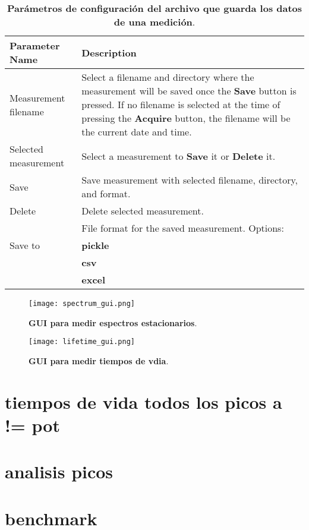 \begin{table}[htbp]
    \centering
    \begin{tabularx}{\textwidth}{|l|X|}
        \hline
        \textbf{Parameter Name} & \textbf{Description} \\
        \hline
        Measurement filename & Select a filename and directory where the measurement will be saved once the \textbf{Save} button is pressed. If no filename is selected at the time of pressing the \textbf{Acquire} button, the filename will be the current date and time. \\
        \hline
        Selected measurement & Select a measurement to \textbf{Save} it or \textbf{Delete} it. \\
        \hline
        Save & Save measurement with selected filename, directory, and format. \\
        \hline
        Delete & Delete selected measurement. \\
        \hline
        \multirow{3}{3cm}{Save to} & File format for the saved measurement. Options: \\
        \cline{2-2}
        & \textbf{pickle} \\
        \cline{2-2}
        & \textbf{csv} \\
        \cline{2-2}
        & \textbf{excel} \\
        \hline
    \end{tabularx}
    \caption{\textbf{Parámetros de configuración del archivo que guarda los datos de una medición}.}
    \label{tab:file_parameters}
\end{table}

\begin{figure}
    \centering
    \texttt{[image: spectrum\_gui.png]}
    \caption{\textbf{GUI para medir espectros estacionarios}.}
    \label{fig:spectrum_gui}
\end{figure}

\begin{figure}
    \centering
    \texttt{[image: lifetime\_gui.png]}
    \caption{\textbf{GUI para medir tiempos de vdia}.}
    \label{fig:lifetime_gui}
\end{figure}


\section{tiempos de vida todos los picos a != pot}
\section{analisis picos}
\section{benchmark}